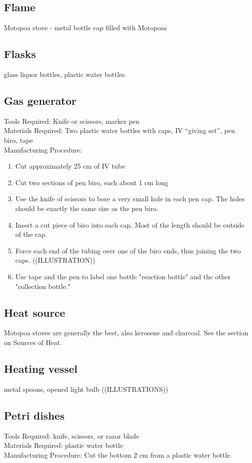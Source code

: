 \subsection{Flame}
Motopoa stove - metal bottle cap filled with Motopoas

\subsection{Flasks}
glass liquor bottles, plastic water bottles

\subsection{Gas generator}
Tools Required: Knife or scissors, marker pen\\
Materials Required: Two plastic water bottles with caps, IV ``giving set'', pen biro, tape\\
Manufacturing Procedure:
\begin{enumerate}
\item{Cut approximately 25 cm of IV tube}
\item{Cut two sections of pen biro, each about 1 cm long}
\item{Use the knife of scissors to bore a very small hole in each pen cap. The holes should be exactly the same size as the pen biro.}
\item{Insert a cut piece of biro into each cap. Most of the length should be outside of the cap.}
\item{Force each end of the tubing over one of the biro ends, thus joining the two caps. ((ILLUSTRATION))}
\item{Use tape and the pen to label one bottle "reaction bottle" and the other "collection bottle."}
\end{enumerate}

\subsection{Heat source}
Motopoa stoves are generally the best, also kerosene and charcoal. See the section on Sources of Heat.

\subsection{Heating vessel}
metal spoons, opened light bulb ((ILLUSTRATIONS))

\subsection{Petri dishes}
Tools Required: knife, scissors, or razor blade\\
Materials Required: plastic water bottle\\
Manufacturing Procedure: Cut the bottom 2 cm from a plastic water bottle.

